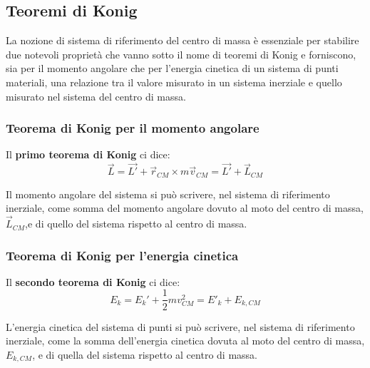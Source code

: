 \documentclass{article}
\numberwithin{equation}{subsection}
\begin{document}
\subsection{Teoremi di Konig}
La nozione di sistema di riferimento del centro di massa è essenziale per stabilire due notevoli proprietà che vanno sotto il nome di teoremi di Konig e forniscono, sia per il momento angolare che per l'energia cinetica di un sistema di punti materiali, una relazione tra il valore misurato in un sistema inerziale e quello misurato nel sistema del centro di massa.
\subsubsection{Teorema di Konig per il momento angolare}
Il \textbf{primo teorema di Konig} ci dice:
\begin{equation}
    \vec{L}=\vec{L'}+\vec{r}_{CM} \times m\vec{v}_{CM}=\vec{L'}+\vec{L}_{CM}
\end{equation}
\begin{shaded}
    Il momento angolare del sistema si può scrivere, nel sistema di riferimento inerziale, come somma del momento angolare dovuto al moto del centro di massa, $\vec{L}_{CM}$,e di quello del sistema rispetto al centro di massa.
\end{shaded}
\subsubsection{Teorema di Konig per l'energia cinetica}
Il \textbf{secondo teorema di Konig} ci dice:
\begin{equation}
    E_k=E_k'+\frac{1}{2}mv^2_{CM}=E'_k+E_{k,CM}
\end{equation}
\begin{shaded}
    L'energia cinetica del sistema di punti si può scrivere, nel sistema di riferimento inerziale, come la somma dell'energia cinetica dovuta al moto del centro di massa, $E_{k,CM}$, e di quella del sistema rispetto al centro di massa.
\end{shaded}
\end{document}
